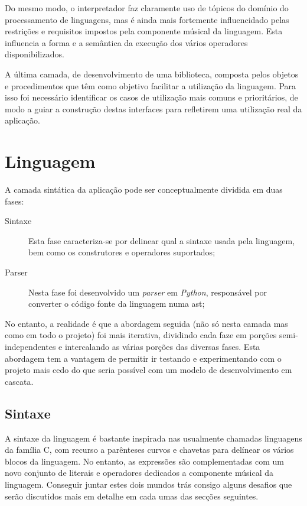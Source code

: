\documentclass[
  oneside,
  11pt, a4paper,
  footinclude=true,
  headinclude=true,
  cleardoublepage=empty
]{scrbook}
\begin{document}
	Do mesmo modo, o interpretador faz claramente uso de tópicos do domínio do processamento de linguagens, mas é ainda mais fortemente influencidado pelas restrições  e requisitos impostos pela componente músical da linguagem. Esta influencia a forma e a semântica da execução dos vários operadores disponibilizados.
	
	A última camada, de desenvolvimento de uma biblioteca, composta pelos objetos e procedimentos que têm como objetivo facilitar a utilização da linguagem. Para isso foi necessário identificar os casos de utilização mais comuns e prioritários, de modo a guiar a construção destas interfaces para refletirem uma utilização real da aplicação.
	
	\section{Linguagem}
	A camada sintática da aplicação pode ser conceptualmente dividida em duas fases:
	\begin{description}
	 \item[Sintaxe] Esta fase caracteriza-se por delinear qual a sintaxe usada pela linguagem, bem como os construtores e operadores suportados;
	 \item[Parser] Nesta fase foi desenvolvido um \textit{parser} em \textit{Python}, responsável por converter o código fonte da linguagem numa \acrfull{ast};
	\end{description}
	
	No entanto, a realidade é que a abordagem seguida (não só nesta camada mas como em todo o projeto) foi mais iterativa, dividindo cada faze em porções semi-independentes e intercalando as várias porções das diversas fases. Esta abordagem tem a vantagem de permitir ir testando e experimentando com o projeto mais cedo do que seria possível com um modelo de desenvolvimento em cascata.
	\subsection{Sintaxe}
	A sintaxe da linguagem é bastante inspirada nas usualmente chamadas linguagens da família C, com recurso a parênteses curvos e chavetas para delínear os vários blocos da linguagem. No entanto, as expressões são complementadas com um novo conjunto de literais e operadores dedicados a componente músical da linguagem. Conseguir juntar estes dois mundos trás consigo alguns desafios que serão discutidos mais em detalhe em cada umas das secções seguintes.
	
\end{document}

